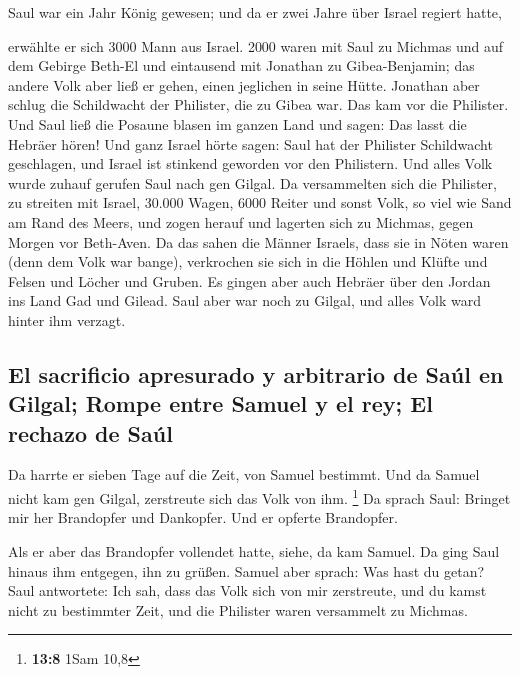  Saul war ein Jahr König gewesen; und da er zwei Jahre
über Israel regiert hatte,

 erwählte er sich 3000 Mann aus Israel. 2000 waren mit
Saul zu Michmas und auf dem Gebirge Beth-El und eintausend mit Jonathan
zu Gibea-Benjamin; das andere Volk aber ließ er gehen, einen jeglichen
in seine Hütte.  Jonathan aber schlug die Schildwacht der
Philister, die zu Gibea war. Das kam vor die Philister. Und Saul ließ
die Posaune blasen im ganzen Land und sagen: Das lasst die Hebräer
hören!  Und ganz Israel hörte sagen: Saul hat der
Philister Schildwacht geschlagen, und Israel ist stinkend geworden vor
den Philistern. Und alles Volk wurde zuhauf gerufen Saul nach gen
Gilgal.  Da versammelten sich die Philister, zu streiten
mit Israel, 30.000 Wagen, 6000 Reiter und sonst Volk, so viel wie Sand
am Rand des Meers, und zogen herauf und lagerten sich zu Michmas, gegen
Morgen vor Beth-Aven.  Da das sahen die Männer Israels,
dass sie in Nöten waren (denn dem Volk war bange), verkrochen sie sich
in die Höhlen und Klüfte und Felsen und Löcher und Gruben.
 Es gingen aber auch Hebräer über den Jordan ins Land Gad
und Gilead. Saul aber war noch zu Gilgal, und alles Volk ward hinter ihm
verzagt.

\hypertarget{el-sacrificio-apresurado-y-arbitrario-de-sauxfal-en-gilgal-rompe-entre-samuel-y-el-rey-el-rechazo-de-sauxfal}{%
\subsection{El sacrificio apresurado y arbitrario de Saúl en Gilgal;
Rompe entre Samuel y el rey; El rechazo de
Saúl}\label{el-sacrificio-apresurado-y-arbitrario-de-sauxfal-en-gilgal-rompe-entre-samuel-y-el-rey-el-rechazo-de-sauxfal}}

 Da harrte er sieben Tage auf die Zeit, von Samuel
bestimmt. Und da Samuel nicht kam gen Gilgal, zerstreute sich das Volk
von ihm. \footnote{\textbf{13:8} 1Sam 10,8}  Da sprach
Saul: Bringet mir her Brandopfer und Dankopfer. Und er opferte
Brandopfer.

 Als er aber das Brandopfer vollendet hatte, siehe, da
kam Samuel. Da ging Saul hinaus ihm entgegen, ihn zu grüßen.
 Samuel aber sprach: Was hast du getan? Saul antwortete:
Ich sah, dass das Volk sich von mir zerstreute, und du kamst nicht zu
bestimmter Zeit, und die Philister waren versammelt zu Michmas.


